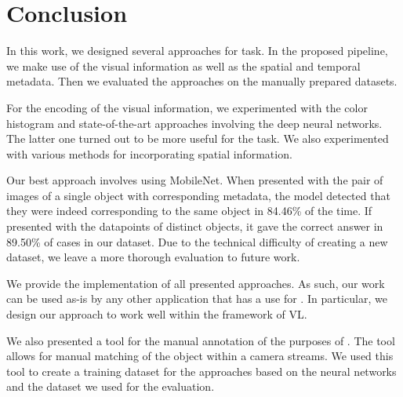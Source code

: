 \chapter*{Conclusion}

In this work, we designed several approaches for \reid{} task. In the proposed pipeline, we make use of the visual information as well as the spatial and temporal metadata. Then we evaluated the approaches on the manually prepared datasets.

For the encoding of the visual information, we experimented with the color histogram and state-of-the-art approaches involving the deep neural networks. The latter one turned out to be more useful for the \reid{} task. We also experimented with various methods for incorporating spatial information.

Our best approach involves using MobileNet. When presented with the pair of images of a single object with corresponding metadata, the model detected that they were indeed corresponding to the same object in 84.46\% of the time. If presented with the datapoints of distinct objects, it gave the correct answer in 89.50\% of cases in our dataset. Due to the technical difficulty of creating a new dataset, we leave a more thorough evaluation to future work.



We provide the implementation of all presented approaches. As such, our work can be used as-is by any other application that has a use for \reid{}. In particular, we design our approach to work well within the framework of \gls{VL}.

We also presented a tool for the manual annotation of the purposes of \reid{}. The tool allows for manual matching of the object within a camera streams. We used this tool to create a training dataset for the approaches based on the neural networks and the dataset we used for the evaluation.


